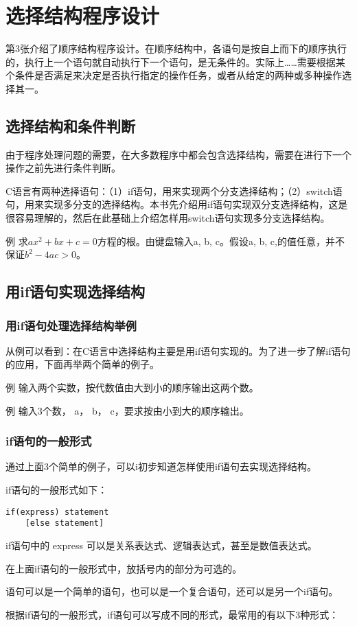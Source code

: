 \chapter{选择结构程序设计}
第3张介绍了顺序结构程序设计。在顺序结构中，各语句是按自上而下的顺序执行的，执行上一个语句就自动执行下一个语句，是无条件的。实际上……需要根据某个条件是否满足来决定是否执行指定的操作任务，或者从给定的两种或多种操作选择其一。
\section{选择结构和条件判断}
由于程序处理问题的需要，在大多数程序中都会包含选择结构，需要在进行下一个操作之前先进行条件判断。

C语言有两种选择语句：（1）if语句，用来实现两个分支选择结构；（2）switch语句，用来实现多分支的选择结构。本书先介绍用if语句实现双分支选择结构，这是很容易理解的，然后在此基础上介绍怎样用switch语句实现多分支选择结构。

例 求$a x^2 + bx + c=0$方程的根。由键盘输入a, b, c。假设a, b, c,的值任意，并不保证$b^2 -4ac >0$。
\section{用if语句实现选择结构}
\subsection{用if语句处理选择结构举例}
从例可以看到：在C语言中选择结构主要是用if语句实现的。为了进一步了解if语句的应用，下面再举两个简单的例子。

例 输入两个实数，按代数值由大到小的顺序输出这两个数。

例 输入3个数， a， b， c，要求按由小到大的顺序输出。
\subsection{if语句的一般形式}
通过上面3个简单的例子，可以i初步知道怎样使用if语句去实现选择结构。

if语句的一般形式如下：
\begin{lstlisting}
if(express) statement
	[else statement]
\end{lstlisting}
if语句中的 express 可以是关系表达式、逻辑表达式，甚至是数值表达式。

在上面if语句的一般形式中，放括号内的部分为可选的。

语句可以是一个简单的语句，也可以是一个复合语句，还可以是另一个if语句。

根据if语句的一般形式，if语句可以写成不同的形式，最常用的有以下3种形式：

